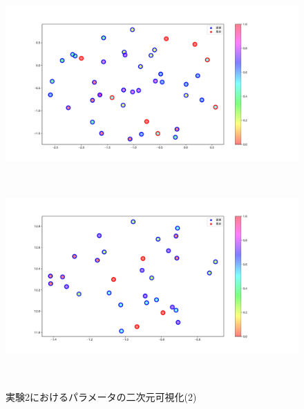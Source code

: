 \begin{figure}[h]
\begin{minipage}[b]{0.48\linewidth}
 \end{minipage}
 \begin{minipage}[b]{0.48\linewidth}
  \centering
  \includegraphics[scale=0.15]{./imgs/tSNE/sofa_10.pdf}
 \end{minipage}\\
 \begin{minipage}[b]{0.48\linewidth}
  \centering
  \includegraphics[scale=0.15]{./imgs/tSNE/sofa_11.pdf}
 \end{minipage}\\
 \caption{実験2におけるパラメータの二次元可視化(2)}\label{fig:tSNE2_2}
\end{figure}